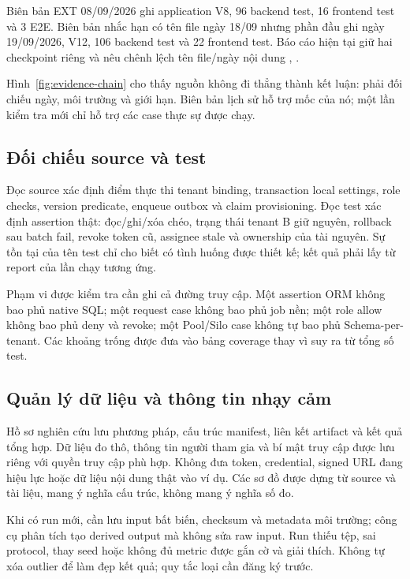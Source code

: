 Biên bản EXT 08\slash 09\slash 2026 ghi application V8, 96 backend test, 16 frontend test và 3 E2E. Biên bản nhắc hạn có tên file ngày 18\slash 09 nhưng phần đầu ghi ngày 19\slash 09\slash 2026, V12, 106 backend test và 22 frontend test. Báo cáo hiện tại giữ hai checkpoint riêng và nêu chênh lệch tên file\slash ngày nội dung , .

Hình~\ref{fig:evidence-chain} cho thấy nguồn không đi thẳng thành kết luận: phải đối chiếu ngày, môi trường và giới hạn. Biên bản lịch sử hỗ trợ mốc của nó; một lần kiểm tra mới chỉ hỗ trợ các case thực sự được chạy.


\subsection{Đối chiếu source và test}
Đọc source xác định điểm thực thi tenant binding, transaction local settings, role checks, version predicate, enqueue outbox và claim provisioning. Đọc test xác định assertion thật: đọc\slash ghi\slash xóa chéo, trạng thái tenant B giữ nguyên, rollback sau batch fail, revoke token cũ, assignee stale và ownership của tài nguyên. Sự tồn tại của tên test chỉ cho biết có tình huống được thiết kế; kết quả phải lấy từ report của lần chạy tương ứng.

Phạm vi được kiểm tra cần ghi cả đường truy cập. Một assertion ORM không bao phủ native SQL; một request case không bao phủ job nền; một role allow không bao phủ deny và revoke; một Pool\slash Silo case không tự bao phủ Schema-per-tenant. Các khoảng trống được đưa vào bảng coverage thay vì suy ra từ tổng số test.

\subsection{Quản lý dữ liệu và thông tin nhạy cảm}
Hồ sơ nghiên cứu lưu phương pháp, cấu trúc manifest, liên kết artifact và kết quả tổng hợp. Dữ liệu đo thô, thông tin người tham gia và bí mật truy cập được lưu riêng với quyền truy cập phù hợp. Không đưa token, credential, signed URL đang hiệu lực hoặc dữ liệu nội dung thật vào ví dụ. Các sơ đồ được dựng từ source và tài liệu, mang ý nghĩa cấu trúc, không mang ý nghĩa số đo.

Khi có run mới, cần lưu input bất biến, checksum và metadata môi trường; công cụ phân tích tạo derived output mà không sửa raw input. Run thiếu tệp, sai protocol, thay seed hoặc không đủ metric được gắn cờ và giải thích. Không tự xóa outlier để làm đẹp kết quả; quy tắc loại cần đăng ký trước.
